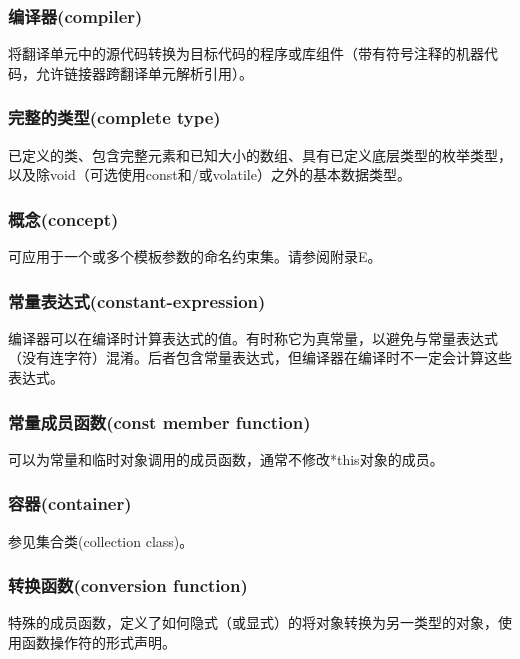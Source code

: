 \subsubsection{编译器(compiler)}

将翻译单元中的源代码转换为目标代码的程序或库组件（带有符号注释的机器代码，允许链接器跨翻译单元解析引用）。

\subsubsection{完整的类型(complete type)}

已定义的类、包含完整元素和已知大小的数组、具有已定义底层类型的枚举类型，以及除void（可选使用const和/或volatile）之外的基本数据类型。

\subsubsection{概念(concept)}

可应用于一个或多个模板参数的命名约束集。请参阅附录E。

\subsubsection{常量表达式(constant-expression)}

编译器可以在编译时计算表达式的值。有时称它为真常量，以避免与常量表达式（没有连字符）混淆。后者包含常量表达式，但编译器在编译时不一定会计算这些表达式。

\subsubsection{常量成员函数(const member function)}

可以为常量和临时对象调用的成员函数，通常不修改*this对象的成员。

\subsubsection{容器(container)}

参见集合类(collection class)。

\subsubsection{转换函数(conversion function)}

特殊的成员函数，定义了如何隐式（或显式）的将对象转换为另一类型的对象，使用函数操作符的形式声明。

